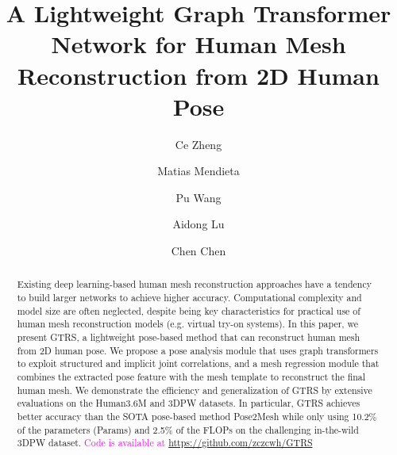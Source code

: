 \documentclass[sigconf]{acmart}
\begin{document}
\title{A Lightweight Graph Transformer Network for Human Mesh Reconstruction from 2D Human Pose}

\author{Ce Zheng}



\author{Matias Mendieta}

\author{Pu Wang}

\author{Aidong Lu}

\author{Chen Chen}

\renewcommand{\shortauthors}{Ce Zheng et al.}

\begin{abstract}
Existing deep learning-based human mesh reconstruction approaches have a tendency to build larger networks to achieve higher accuracy. Computational complexity and model size are often neglected, despite being key characteristics for practical use of human mesh reconstruction models (e.g. virtual try-on systems). In this paper, we present GTRS, a lightweight pose-based method that can reconstruct human mesh from 2D human pose.
We propose a pose analysis module that uses graph transformers to exploit structured and implicit joint correlations, and a mesh regression module that combines the extracted pose feature with the mesh template to reconstruct the final human mesh.  We demonstrate the efficiency and generalization of GTRS by extensive evaluations on the Human3.6M and 3DPW datasets. In particular, GTRS achieves better accuracy than the SOTA pose-based method Pose2Mesh while only using 10.2\% of the parameters (Params) and 2.5\% of the FLOPs on the challenging in-the-wild 3DPW dataset. \textcolor{magenta}{Code is available at \url{https://github.com/zczcwh/GTRS}} \end{abstract}
\end{document}
